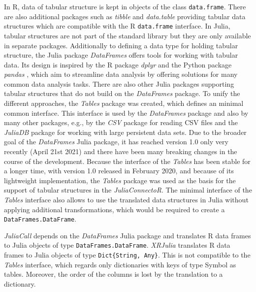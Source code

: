 \documentclass[12pt]{article}
\newcommand{\inlinecode}[1]{\texttt{#1}}
\newcommand{\apkg}[1]{\emph{#1}}
\begin{document}
In R, data of tabular structure is kept in objects of the class \inlinecode{data.frame}.
There are also additional packages such as \apkg{tibble} \citep{tibble} and \apkg{data.table} \citep{datatable} providing tabular data structures which are compatible with the R \inlinecode{data.frame} interface.
In Julia, tabular structures are not part of the standard library but they are only available in separate packages.
Additionally to defining a data type for holding tabular structure, the Julia package \apkg{DataFrames} \citep{juliaDataFramesGithub} offers tools for working with tabular data.
Its design is inspired by the R package \apkg{dplyr} \citep{dplyr} and the Python package \apkg{pandas} \citep{pandas}, which aim to streamline data analysis by offering solutions for many common data analysis tasks.
There are also other Julia packages supporting tabular structures that do not build on the \apkg{DataFrames} package.
To unify the different approaches, the \apkg{Tables} package \citep{tables.jl} was created, which defines an minimal common interface.
This interface is used by the \apkg{DataFrames} package and also by many other packages, e.g., by the \apkg{CSV} \citep{juliacsvGithub} package for reading CSV files and the \apkg{JuliaDB} package \citep{juliadbGithub} for working with large persistent data sets.
Due to the broader goal of the \apkg{DataFrames} Julia package, it has reached version 1.0 only very recently (April 21st 2021) and there have been many breaking changes in the course of the development.
Because the interface of the \apkg{Tables} has been stable for a longer time, with version 1.0 released in February 2020, and because of its lightweight implementation, the \apkg{Tables} package was used as the basis for the support of tabular structures in the \apkg{JuliaConnectoR}.
The minimal interface of the \apkg{Tables} interface also allows to use the translated data structures in Julia without applying additional transformations, which would be required to create a \inlinecode{DataFrames.DataFrame}.

\apkg{JuliaCall} depends on the \apkg{DataFrames} Julia package and translates R data frames to Julia objects of type \inlinecode{DataFrames.DataFrame}.
\apkg{XRJulia} translates R data frames to Julia objects of type \inlinecode{Dict\{String, Any\}}.
This is not compatible to the \apkg{Tables} interface, which regards only dictionaries with keys of type {Symbol} as tables.
Moreover, the order of the columns is lost by the translation to a dictionary.
\end{document}
